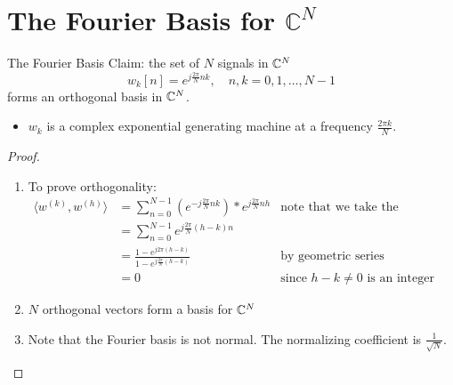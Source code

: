 \documentclass[../main.tex]{subfiles}
\begin{document}
\section{The Fourier Basis for $\mathbb{C}^N$}
\begin{bbox}{The Fourier Basis}
    Claim: the set of $N$ signals in $\mathbb{C}^N$ \[
    w_k[n] = e^{j\frac{2\pi}{N}nk}, \quad n,k=0,1,\dots, N-1
    \] forms an orthogonal basis in $\mathbb{C}^N$.
    \begin{itemize}
        \item $w_k$ is a complex exponential generating machine at a frequency $\frac{2\pi k}{N}$.
    \end{itemize}
    \begin{proof}
        \begin{enumerate}
            \item To prove orthogonality: \begin{align*}
                \langle w^{(k)},w^{(h)}\rangle &= \sum_{n=0}^{N-1}(e^{-j\frac{2\pi}{N}nk})*e^{j\frac{2\pi}{N}nh}&\text{note that we take the conjugate}\\
                &=\sum_{n=0}^{N-1}e^{j\frac{2\pi}{N}(h-k)n}\\
                &= \frac{1-e^{j2\pi(h-k)}}{1-e^{j\frac{2\pi}{N}(h-k)}}&\text{by geometric series}\\
                &= 0 &\text{since $h-k\neq 0$ is an integer }
            \end{align*}
            \item $N$ orthogonal vectors form a basis for $\mathbb{C}^N$
            \item Note that the Fourier basis is not normal. The normalizing coefficient is $\frac{1}{\sqrt{N}}$.
        \end{enumerate}
    \end{proof}
\end{bbox}
\end{document}
